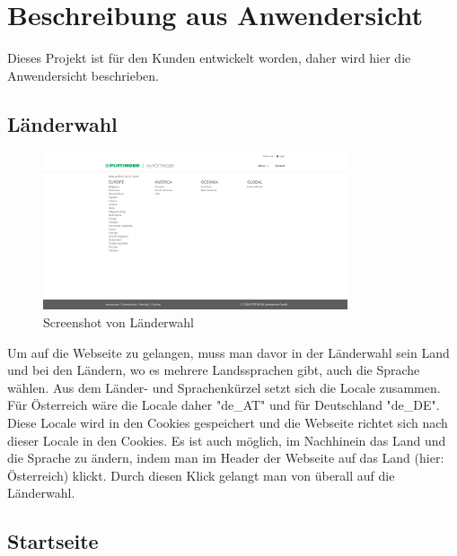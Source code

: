 \chapter{Beschreibung aus Anwendersicht} \label{anwendersicht}

Dieses Projekt ist für den Kunden entwickelt worden, daher wird hier die Anwendersicht beschrieben.

\section{Länderwahl}
\begin{figure}[h]
	\centerline{
		\includegraphics[width=0.8\textwidth]{./grafiken/erm_country_selection.png}
	}
	\vskip0pt
	\caption{Screenshot von Länderwahl} \label{fig:countrySelection}
\end{figure}

Um auf die Webseite zu gelangen, muss man davor in der Länderwahl sein Land und bei den Ländern, wo es mehrere Landssprachen gibt, auch die Sprache wählen. Aus dem Länder- und Sprachenkürzel setzt sich die Locale zusammen. Für Österreich wäre die Locale daher "de\_AT" und für Deutschland "de\_DE". Diese Locale wird in den Cookies gespeichert und die Webseite richtet sich nach dieser Locale in den Cookies. Es ist auch möglich, im Nachhinein das Land und die Sprache zu ändern, indem man im Header der Webseite auf das Land (hier: Österreich) klickt. Durch diesen Klick gelangt man von überall auf die Länderwahl.

\section{Startseite}
